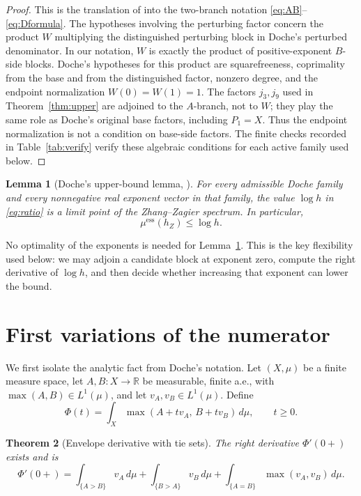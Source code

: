 \documentclass[11pt,reqno]{amsart}
\theoremstyle{plain}
\newtheorem{theorem}{Theorem}
\newtheorem{lemma}[theorem]{Lemma}
\theoremstyle{definition}
\theoremstyle{remark}
\newcommand{\R}{\mathbb{R}}
\newcommand{\hZ}{h_Z}
\newcommand{\essmin}{\mu^{\mathrm{ess}}(\hZ)}
\begin{document}
\begin{proof}
This is the translation of \citet[Lemmas 2--5]{Doc01a} into the two-branch notation
\eqref{eq:AB}--\eqref{eq:Dformula}.  The hypotheses involving the perturbing factor
concern the product $W$ multiplying the distinguished perturbing block in Doche's
perturbed denominator.  In our notation, $W$ is exactly the product of positive-exponent
$B$-side blocks.  Doche's hypotheses for this product are squarefreeness, coprimality
from the base and from the distinguished factor, nonzero degree, and the endpoint
normalization $W(0)=W(1)=1$.  The factors $j_3,j_9$ used in
Theorem~\ref{thm:upper} are adjoined to the $A$-branch, not to $W$; they play the same
role as Doche's original base factors, including $P_1=X$.  Thus the endpoint
normalization is not a condition on base-side factors.  The finite checks recorded in
Table~\ref{tab:verify} verify these algebraic conditions for each active family used
below.
\end{proof}

\begin{lemma}[Doche's upper-bound lemma, \citealp{Doc01a,Doc01b}]\label{lem:doche}
For every admissible Doche family and every nonnegative real exponent vector in that
family, the value $\log h$ in \eqref{eq:ratio} is a limit point of the
Zhang--Zagier spectrum.  In particular,
\[
  \essmin\le \log h .
\]
\end{lemma}

No optimality of the exponents is needed for Lemma~\ref{lem:doche}.  This is the key
flexibility used below: we may adjoin a candidate block at exponent zero, compute the
right derivative of $\log h$, and then decide whether increasing that exponent can
lower the bound.

\section{First variations of the numerator}\label{sec:firstvar}

We first isolate the analytic fact from Doche's notation.  Let $(X,\mu)$ be a finite
measure space, let $A,B:X\to\R$ be measurable, finite a.e., with
$\max(A,B)\in L^1(\mu)$, and let $v_A,v_B\in L^1(\mu)$.  Define
\[
  \Phi(t)=\int_X\max(A+t v_A,\,B+t v_B)\,d\mu,\qquad t\ge0.
\]

\begin{theorem}[Envelope derivative with tie sets]\label{thm:abstract-envelope}
The right derivative $\Phi'(0+)$ exists and is
\begin{equation}\label{eq:abstract-envelope}
  \Phi'(0+)=
  \int_{\{A>B\}}v_A\,d\mu+\int_{\{B>A\}}v_B\,d\mu
  +\int_{\{A=B\}}\max(v_A,v_B)\,d\mu .
\end{equation}
\end{theorem}
\end{document}
